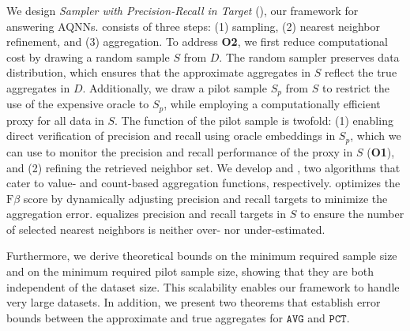We design \textit{Sampler with Precision-Recall in Target} (\sprint), our framework for answering AQNNs. \sprint consists of three steps: (1) sampling, (2) nearest neighbor refinement, and (3) aggregation. To address \textbf{O2}, we first reduce computational cost by drawing a random sample \(S\) from \(D\). The random sampler preserves data distribution, which ensures that the approximate aggregates in \(S\) reflect the true aggregates in \(D\). Additionally, we draw a pilot sample \(S_p\) from \(S\) to restrict the use of the expensive oracle to \(S_p\), while employing a computationally efficient proxy for all data in \(S\). The function of the pilot sample is twofold: (1) enabling direct verification of precision and recall using oracle embeddings in \(S_p\), which we can use to monitor the precision and recall performance of the proxy in \(S\) (\textbf{O1}), and (2) refining the retrieved neighbor set. We develop \sprintv and \sprintc, two algorithms that cater to value- and count-based aggregation functions, respectively. \sprintv optimizes the \(\text{F}{\beta}\) score by dynamically adjusting precision and recall targets to minimize the aggregation error. \sprintc equalizes precision and recall targets in \(S\) to ensure the number of selected nearest neighbors is neither over- nor under-estimated. 

Furthermore, we derive theoretical bounds on the minimum required sample size and on the minimum required pilot sample size, showing that they are both independent of the dataset size. This scalability enables our framework to handle very large datasets. In addition, we present two theorems that establish error bounds between the approximate and true aggregates for \(\mathtt{AVG}\) and \(\mathtt{PCT}\).\\


